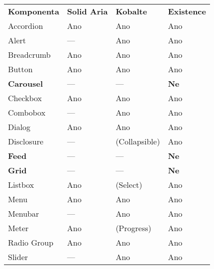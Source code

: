 \begin{table}
    \begin{tabularx}{\textwidth}{Y Y Y Y}
        \bfseries{Komponenta} & \bfseries{Solid Aria} & \bfseries{Kobalte} & \bfseries{Existence} \\\Midrule{}
        Accordion             & Ano                   & Ano                & Ano                  \\
        Alert                 & ---                   & Ano                & Ano                  \\
        Breadcrumb            & Ano                   & Ano                & Ano                  \\
        Button                & Ano                   & Ano                & Ano                  \\
        \textbf{Carousel}     & ---                   & ---                & \textbf{Ne}          \\
        Checkbox              & Ano                   & Ano                & Ano                  \\
        Combobox              & ---                   & Ano                & Ano                  \\
        Dialog                & Ano                   & Ano                & Ano                  \\
        Disclosure            & ---                   & (Collapsible)      & Ano                  \\
        \textbf{Feed}         & ---                   & ---                & \textbf{Ne}          \\
        \textbf{Grid}         & ---                   & ---                & \textbf{Ne}          \\
        Listbox               & Ano                   & (Select)           & Ano                  \\
        Menu                  & Ano                   & Ano                & Ano                  \\
        Menubar               & ---                   & Ano                & Ano                  \\
        Meter                 & Ano                   & (Progress)         & Ano                  \\
        Radio Group           & Ano                   & Ano                & Ano                  \\
        Slider                & ---                   & Ano                & Ano                  \\

\end{tabularx}
\end{table}
